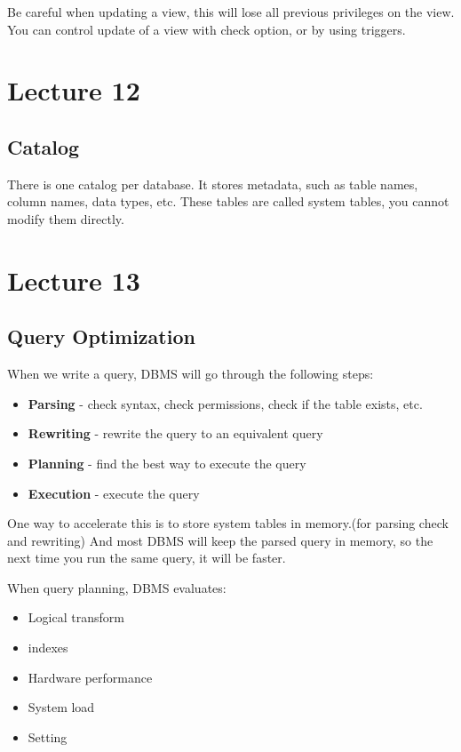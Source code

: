 \documentclass[a4paper,12pt]{article}
\begin{document}
Be careful when updating a view, this will lose all previous privileges on the view.
You can control update of a view with check option, or by using triggers.

\section{Lecture 12}

\subsection{Catalog}

There is one catalog per database.
It stores metadata, such as table names, column names, data types, etc.
These tables are called system tables, you cannot modify them directly.

\section{Lecture 13}

\subsection{Query Optimization}

When we write a query, DBMS will go through the following steps:
\begin{itemize}
	\item \textbf{Parsing} - check syntax, check permissions, check if the table exists, etc.
	\item \textbf{Rewriting} - rewrite the query to an equivalent query
	\item \textbf{Planning} - find the best way to execute the query
	\item \textbf{Execution} - execute the query
\end{itemize}

One way to accelerate this is to store system tables in memory.(for parsing check and rewriting)
And most DBMS will keep the parsed query in memory, so the next time you run the same query, it will be faster.

When query planning, DBMS evaluates:
\begin{itemize}
	\item Logical transform
	\item indexes
	\item Hardware performance
	\item System load
	\item Setting
\end{itemize}
\end{document}
